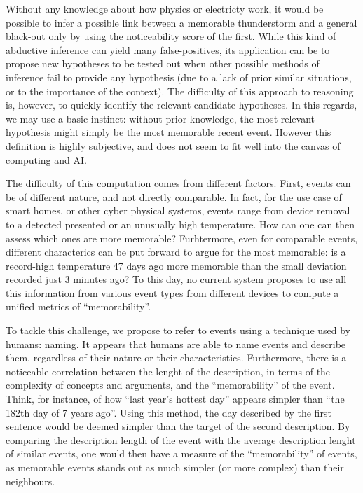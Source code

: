 \documentclass[conference]{IEEEtran}
\begin{document}
Without any knowledge about how physics or electricty work, it would be possible
to infer a possible link between a memorable thunderstorm and a general
black-out only by using the noticeability score of the first. While this kind of
abductive inference can yield many false-positives, its application can be to
propose new hypotheses to be tested out when other possible methods of inference
fail to provide any hypothesis (due to a lack of prior similar situations, or to
the importance of the context). The difficulty of this approach to reasoning is,
however, to quickly identify the relevant candidate hypotheses. In this regards,
we may use a basic instinct: without prior knowledge, the most relevant
hypothesis might simply be the most memorable recent event. However this
definition is highly subjective, and does not seem to fit well into the canvas
of computing and AI.

The difficulty of this computation comes from different factors. First, events
can be of different nature, and not directly comparable. In fact, for the use
case of smart homes, or other cyber physical systems, events range from device
removal to a detected presented or an unusually high temperature. How can one
can then assess which ones are more memorable? Furhtermore, even for comparable
events, different characterics can be put forward to argue for the most
memorable: is a record-high temperature 47 days ago more memorable than the
small deviation recorded just 3 minutes ago? To this day, no current system
proposes to use all this information from various event types from different
devices to compute a unified metrics of ``memorability''.

%

To tackle this challenge, we propose to refer to events using a technique used
by humans: naming. It appears that humans are able to name events and describe
them, regardless of their nature or their characteristics. Furthermore, there is
a noticeable correlation between the lenght of the description, in terms of the
complexity of concepts and arguments, and the ``memorability'' of the event.
Think, for instance, of how ``last year's hottest day'' appears simpler than
``the 182th day of 7 years ago''. Using this method, the day described by the
first sentence would be deemed simpler than the target of the second
description. By comparing the description length of the event with the average
description lenght of similar events, one would then have a measure of the
``memorability'' of events, as memorable events stands out as much simpler (or
more complex) than their neighbours.
\end{document}
